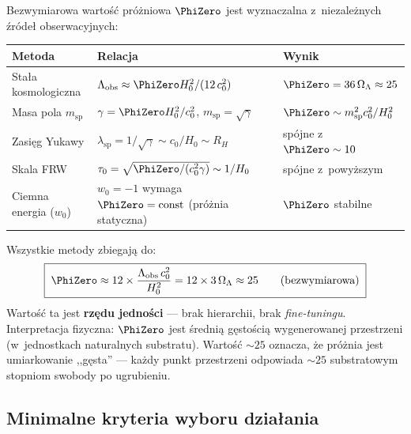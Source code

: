 \begin{proposition}\label{prop:Phi0-estimate}
Bezwymiarowa warto\'s\'c pr\'o\.zniowa $\PhiZero$ jest
wyznaczalna z~niezale\.znych \'zr\'ode\l{} obserwacyjnych:

\medskip
\begin{center}
\small
\begin{tabular}{@{}lll@{}}
\toprule
\textbf{Metoda} & \textbf{Relacja} & \textbf{Wynik} \\
\midrule
Sta\l{}a kosmologiczna
  & $\Lambda_{\mathrm{obs}} \approx \PhiZero H_0^2 / (12\,c_0^2)$
  & $\PhiZero = 36\,\Omega_\Lambda
    \approx 25$ \\[4pt]
Masa pola $m_{\mathrm{sp}}$
  & $\gamma = \PhiZero H_0^2/c_0^2$,\;
    $m_{\mathrm{sp}} = \sqrt\gamma$
  & $\PhiZero \sim m_{\mathrm{sp}}^2 c_0^2/H_0^2$ \\[4pt]
Zasi\k{e}g Yukawy
  & $\lambda_{\mathrm{sp}} = 1/\sqrt\gamma
    \sim c_0/H_0 \sim R_H$
  & sp\'ojne z~$\PhiZero \sim 10$ \\[4pt]
Skala FRW
  & $\tau_0 = \sqrt{\PhiZero/(c_0^2\gamma)} \sim 1/H_0$
  & sp\'ojne z~powy\.zszym \\[4pt]
Ciemna energia ($w_0$)
  & $w_0 = -1$ wymaga $\PhiZero = \mathrm{const}$
    (pr\'o\.znia statyczna)
  & $\PhiZero$ stabilne \\
\bottomrule
\end{tabular}
\end{center}

\medskip\noindent
Wszystkie metody zbiegaj\k{a} do:
\begin{equation}\label{eq:Phi0-value}
  \boxed{\;\PhiZero \approx 12 \times \frac{\Lambda_{\mathrm{obs}}\,c_0^2}{H_0^2}
  = 12 \times 3\,\Omega_\Lambda \approx 25
  \qquad (\text{bezwymiarowa})\;}
\end{equation}
Warto\'s\'c ta jest \textbf{rz\k{e}du jedno\'sci} ---
brak hierarchii, brak \emph{fine-tuningu}.
Interpretacja fizyczna: $\PhiZero$ jest \'sredni\k{a}
g\k{e}sto\'sci\k{a} wygenerowanej przestrzeni (w~jednostkach
naturalnych substratu). Warto\'s\'c $\sim 25$ oznacza,
\.ze pr\'o\.znia jest umiarkowanie ,,g\k{e}sta''
--- ka\.zdy punkt przestrzeni odpowiada $\sim 25$
substratowym stopniom swobody po ugrubieniu.
\end{proposition}

\subsection{Minimalne kryteria wyboru dzia\l{}ania}\label{ssec:kryteria}

